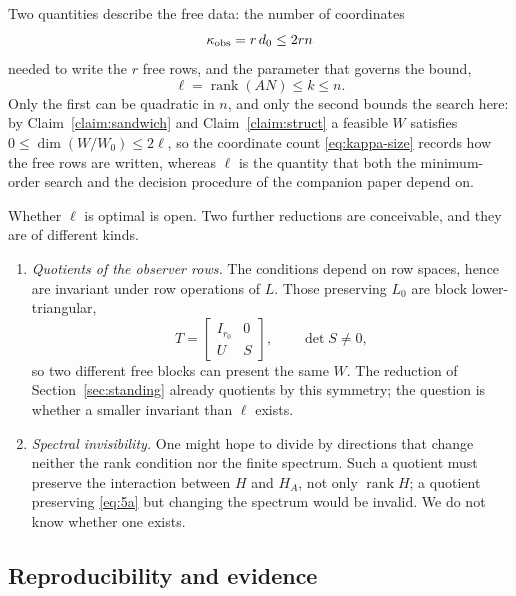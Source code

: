 ﻿\documentclass[journal]{IEEEtran}
\theoremstyle{plainn}
\theoremstyle{remark}
\begin{document}
Two quantities describe the free data: the number of coordinates
\begin{equation}\label{eq:kappa-size}
\kappa_{\rm obs}=r\,d_0\le2rn
\end{equation}
needed to write the $r$ free rows, and the parameter that governs the bound,
\begin{equation*}
\ell=\operatorname{rank}(AN)\le k\le n .
\end{equation*}
Only the first can be quadratic in $n$, and only the second bounds the search here: by
Claim~\ref{claim:sandwich} and Claim~\ref{claim:struct} a feasible $W$ satisfies
$0\le\dim(W/W_0)\le2\ell$, so the coordinate count \eqref{eq:kappa-size} records how the free rows are
written, whereas $\ell$ is the quantity that both the minimum-order search and the decision procedure
of the companion paper depend on.

Whether $\ell$ is optimal is open. Two further reductions are conceivable, and they are of different
kinds.

\begin{enumerate}
\item \emph{Quotients of the observer rows.} The conditions depend on row spaces, hence are
invariant under row operations of $L$. Those preserving $L_0$ are block lower-triangular,
\begin{equation*}
T=\begin{bmatrix}I_{r_0}&0\\ U&S\end{bmatrix},\qquad \det S\ne0 ,
\end{equation*}
so two different free blocks can present the same $W$. The reduction of
Section~\ref{sec:standing} already quotients by this symmetry; the question is whether a
smaller invariant than $\ell$ exists.
\item \emph{Spectral invisibility.} One might hope to divide by directions that change neither
the rank condition nor the finite spectrum. Such a quotient must preserve the interaction
between $H$ and $H_A$, not only $\operatorname{rank}H$; a quotient preserving \eqref{eq:5a} but
changing the spectrum would be invalid. We do not know whether one exists.
\end{enumerate}

\subsection{Reproducibility and evidence}\label{sec:repro}
\end{document}
